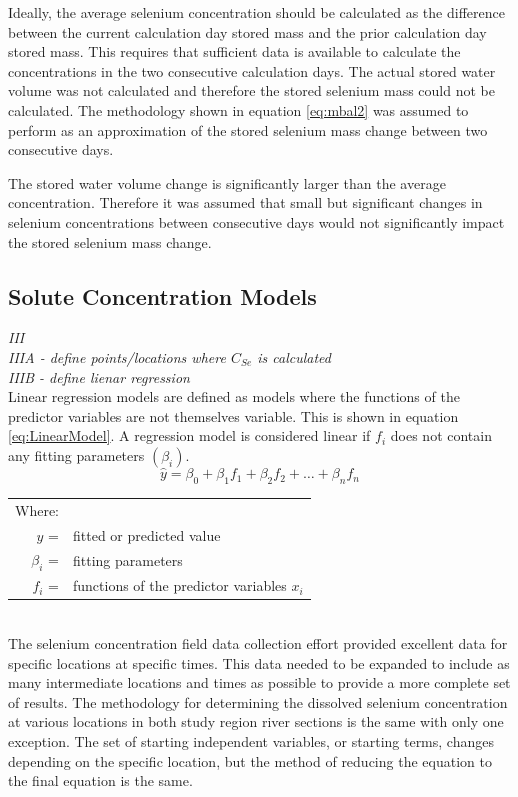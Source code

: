 \begin{linenumbers}
Ideally, the average selenium concentration should be calculated as the difference between the current calculation day stored mass and the prior calculation day stored mass.  This requires that sufficient data is available to calculate the concentrations in the two consecutive calculation days.  The actual stored water volume was not calculated and therefore the stored selenium mass could not be calculated.  The methodology shown in equation \ref{eq:mbal2} was assumed to perform as an approximation of the stored selenium mass change between two consecutive days.

The stored water volume change is significantly larger than the average concentration.  Therefore it was assumed that small but significant changes in selenium concentrations between consecutive days would not significantly impact the stored selenium mass change.

\clearpage{}
\subsection{Solute Concentration Models}
\emph{III}\\

\emph{IIIA - define points/locations where $C_{Se}$ is calculated}\\

\emph{IIIB - define lienar regression}\\

Linear regression models are defined as models where the functions of the predictor variables are not themselves variable.  This is shown in equation \ref{eq:LinearModel}.  A regression model is considered linear if $f_i$ does not contain any fitting parameters $(\beta_i)$.
\begin{equation}
\label{eq:LinearModel}
\hat{y}=\beta_0+\beta_1 f_1+\beta_2 f_2+\ldots+\beta_n f_n
\end{equation}
\begin{tabular}{r l}
Where:&\\
$\hat{y}$ = & fitted or predicted value\\
$\beta_i$ = & fitting parameters\\
$f_i$ = & functions of the predictor variables $x_i$\\
\end{tabular}\\

The selenium concentration field data collection effort provided excellent data for specific locations at specific times.  This data needed to be expanded to include as many intermediate locations and times as possible to provide a more complete set of results.  The methodology for determining the dissolved selenium concentration at various locations in both study region river sections is the same with only one exception.  The set of starting independent variables, or starting terms, changes depending on the specific location, but the method of reducing the equation to the final equation is the same.


\end{linenumbers}
